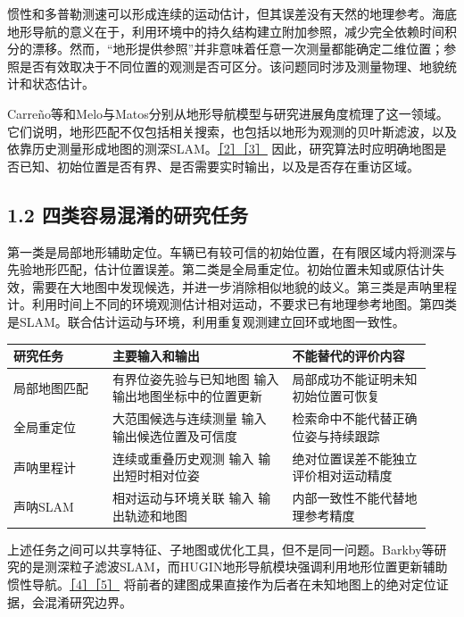 惯性和多普勒测速可以形成连续的运动估计，但其误差没有天然的地理参考。海底地形导航的意义在于，利用环境中的持久结构建立附加参照，减少完全依赖时间积分的漂移。然而，``地形提供参照''并非意味着任意一次测量都能确定二维位置；参照是否有效取决于不同位置的观测是否可区分。该问题同时涉及测量物理、地貌统计和状态估计。

Carreño等和Melo与Matos分别从地形导航模型与研究进展角度梳理了这一领域。它们说明，地形匹配不仅包括相关搜索，也包括以地形为观测的贝叶斯滤波，以及依靠历史测量形成地图的测深SLAM。\href{https://eprints.soton.ac.uk/153897/1/Carreno_2010_-_A_survey__on_TBN_for_AUVs.pdf}{［2］}\href{https://doi.org/10.1016/j.oceaneng.2017.04.047}{［3］} 因此，研究算法时应明确地图是否已知、初始位置是否有界、是否需要实时输出，以及是否存在重访区域。

\hypertarget{ux56dbux7c7bux5bb9ux6613ux6df7ux6dc6ux7684ux7814ux7a76ux4efbux52a1}{%
\subsection{1.2 四类容易混淆的研究任务}\label{ux56dbux7c7bux5bb9ux6613ux6df7ux6dc6ux7684ux7814ux7a76ux4efbux52a1}}

第一类是局部地形辅助定位。车辆已有较可信的初始位置，在有限区域内将测深与先验地形匹配，估计位置误差。第二类是全局重定位。初始位置未知或原估计失效，需要在大地图中发现候选，并进一步消除相似地貌的歧义。第三类是声呐里程计。利用时间上不同的环境观测估计相对运动，不要求已有地理参考地图。第四类是SLAM。联合估计运动与环境，利用重复观测建立回环或地图一致性。

\begin{longtable}[]{@{}p{0.22\linewidth}p{0.40\linewidth}p{0.31\linewidth}@{}}
\toprule
研究任务 & 主要输入和输出 & 不能替代的评价内容\tabularnewline
\midrule
\endhead
局部地图匹配 & 有界位姿先验与已知地图 输入 输出地图坐标中的位置更新 & 局部成功不能证明未知初始位置可恢复\tabularnewline
全局重定位 & 大范围候选与连续测量 输入 输出候选位置及可信度 & 检索命中不能代替正确位姿与持续跟踪\tabularnewline
声呐里程计 & 连续或重叠历史观测 输入 输出短时相对位姿 & 绝对位置误差不能独立评价相对运动精度\tabularnewline
声呐SLAM & 相对运动与环境关联 输入 输出轨迹和地图 & 内部一致性不能代替地理参考精度\tabularnewline
\bottomrule
\end{longtable}

上述任务之间可以共享特征、子地图或优化工具，但不是同一问题。Barkby等研究的是测深粒子滤波SLAM，而HUGIN地形导航模块强调利用地形位置更新辅助惯性导航。\href{https://doi.org/10.1177/0278364912459666}{［4］}\href{https://www.navlab.net/Publications/The_HUGIN_AUV_Terrain_Navigation_Module.pdf}{［5］} 将前者的建图成果直接作为后者在未知地图上的绝对定位证据，会混淆研究边界。

